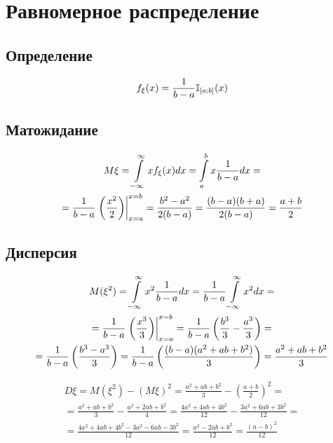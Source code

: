 \section{Равномерное распределение}

\subsection{Определение}
\begin{equation}
	f_\xi(x) = \frac{1}{b-a} \mathbb{I}_{[a;b]}(x)
\end{equation}
\subsection{Матожидание}

\begin{multline}
M\xi =  \int\limits_{-\infty }^{\infty } xf_\xi(x) dx =
\int\limits_{a }^{b } x \frac{1}{b-a} dx =
\\=
\frac{1}{b-a} \left.  \left( \frac{x^2}{2} \right)   \right|_{ x=a}^{ x=b}=
\frac{b^2-a^2}{2(b-a)}=
\frac{(b-a)(b+a)}{2(b-a)}=
\frac{a+b}{2}
\end{multline}

\subsection{Дисперсия}
\begin{multline}
    M( \xi ^2) = 
    \int\limits_{-\infty }^{\infty } x^2 \frac{1}{b-a}dx =
    \frac{1}{b-a} \int\limits_{-\infty }^{\infty } x^2 dx =
    \\=
    \frac{1}{b-a}\left. \left( \frac{x^3}{3} \right)  \right|_{ x=a}^{ x=b} = 
    \frac{1}{b-a} \left( \frac{b^3}{3} - \frac{a^3}{3}\right) =
    \\=
    \frac{1}{b-a} \left( \frac{b^3 - a^3}{3} \right) = 
    \frac{1}{b-a} \left( \frac{(b-a)(a^2+ab+b^2)}{3} \right) = 
    \frac{a^2+ab+b^2}{3}
\end{multline}

\begin{multline}
	D\xi =
	M(\xi^2)-(M\xi)^2 = 
	\frac{a^2+ab+b^2}{3} - \left( \frac{a+b}{2} \right)^2  =
	\\=
	\frac{a^2+ab+b^2}{3} - \frac{a^2+2ab+b^2}{4} =  
	\frac{4a^2+4ab+4b^2}{12} - \frac{3a^2+6ab+3b^2}{12} = 
	\\= 
	\frac{4a^2+4ab+4b^2-3a^2-6ab-3b^2}{12}=  
	\frac{a^2 -2ab + b^2 }{12}=  
	\frac{(a-b)^2}{12}  
\end{multline}

